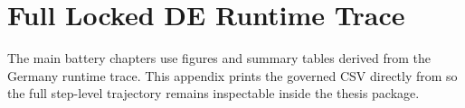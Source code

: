 \chapter{Full Locked DE Runtime Trace}
\label{app:full-de-trace}

The main battery chapters use figures and summary tables derived from the
Germany runtime trace. This appendix prints the governed CSV directly from
 so the full step-level
trajectory remains inspectable inside the thesis package.


